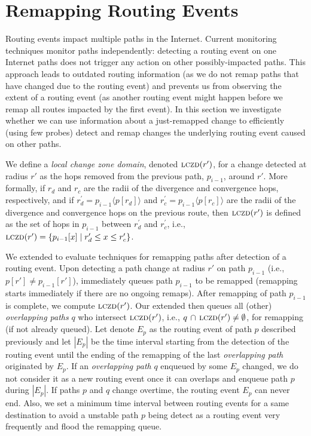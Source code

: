 \section{Remapping Routing Events}
\label{sec:patching}

Routing events impact multiple paths in the Internet. Current
monitoring techniques monitor paths independently: detecting
a routing event on one Internet paths does not trigger any action on
other possibly-impacted paths.  This approach leads to outdated
routing information (as we do not remap paths that have 
changed due to the routing event) and prevents us from
observing the extent of a routing event (as another routing event
might happen before we remap all routes impacted by the first event).
In this section we investigate whether we can use information about
a just-remapped change to efficiently (using few probes) detect and remap changes the
underlying routing event caused on other paths.  


\newcommand{\lczd}{\ensuremath\mathrm{\textsc{lczd}}}

We define a \emph{local change zone domain}, denoted $\lczd(r')$,
for a change detected at radius $r'$ as the hops removed from the
previous path, $p_{i-1}$, around $r'$. More formally, if $r_d$ and
$r_c$ are the radii of the divergence and convergence hops,
respectively, and if $r^\prime_d = p_{i-1}\langle p[r_d]\rangle$ and
$r^\prime_c = p_{i-1}\langle p[r_c]\rangle$ are the radii of the
divergence and convergence hops on the previous route, then
$\lczd(r')$ is defined as the set of hops in $p_{i-1}$ between
$r^\prime_d$ and $r^\prime_c$, i.e., $\lczd(r') = \{p_{i-1}[x]
\mid{} r^\prime_d \le x \le r^\prime_c\}$.

We extended \dtrack{} to evaluate techniques for remapping paths
after detection of a routing event.  Upon detecting a path change at
radius $r'$ on path $p_{i-1}$ (i.e., $p[r'] \ne p_{i-1}[r']$),
\dtrack{} immediately queues path $p_{i-1}$ to be remapped
(remapping starts immediately if there are no ongoing remaps).
After remapping of path $p_{i-1}$ is complete, we compute
$\lczd(r')$. Our extended \dtrack{} then queues all (other)
\emph{overlapping paths} $q$ who intersect $\lczd(r')$, i.e., $q\,
\cap\,\lczd(r') \ne \emptyset$, for remapping (if not already queued).
Let denote $E_p$ as the routing event of path $p$ described previously
and let $|E_p|$ be the time interval starting from the detection of the routing event
until the ending of the remapping of the last \emph{overlapping path}
originated by $E_p$.
If an \emph{overlapping path} $q$ enqueued by some $E_p$ changed, we do not consider
it as a new routing event once it can overlaps and enqueue path $p$ during
$|E_p|$. If paths $p$ and $q$ change overtime, the routing event $E_p$ can never
end. Also, we set a minimum time interval between routing events for a same
destination to avoid a unstable path $p$ being detect as a routing event very
frequently and flood the remapping queue.

